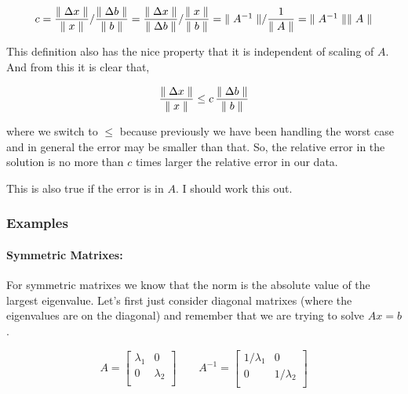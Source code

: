 \documentclass{article}
\newcommand{\norm}[1]{\mbox{\ensuremath{\parallel #1 \parallel}}}
\begin{document}
\begin{equation}
    c =
    \frac{\norm{\Delta x}}{\norm{x}} / \frac{\norm{\Delta b}}{\norm{b}} =
    \frac{\norm{\Delta x}}{\norm{\Delta b}} / \frac{\norm{x}}{\norm{b}} =
    \norm{A^{-1}} / \frac{1}{\norm{A}} =
    \norm{A^{-1}} \norm{A}
\end{equation}

\noindent
This definition also has the nice property that it is independent of scaling of $A$. And from this it is clear that,

\begin{equation}
    \frac{\norm{\Delta x}}{\norm{x}} \leq c \, \frac{\norm{\Delta b}}{\norm{b}}
\end{equation}

\noindent
where we switch to $\leq$ because previously we have been handling the worst case and in general the error may be smaller than that.
So, the relative error in the solution is no more than $c$ times larger the relative error in our data.

This is also true if the error is in $A$. I should work this out.

\subsubsection{Examples}

\paragraph{Symmetric Matrixes:}

For symmetric matrixes we know that the norm is the absolute value of the largest eigenvalue. Let's first just consider diagonal matrixes (where the eigenvalues are on the diagonal) and remember that we are trying to solve $A x = b$.

\begin{equation}
    A = \begin{bmatrix}
        \lambda_1 & 0         \\
        0         & \lambda_2 \\
    \end{bmatrix}
    \qquad
    A^{-1} = \begin{bmatrix}
        1/\lambda_1 & 0           \\
        0           & 1/\lambda_2 \\
    \end{bmatrix}
\end{equation}
\end{document}
